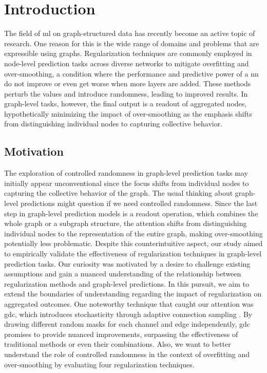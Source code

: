 \chapter{Introduction}%
\label{sec:intro}

\setcounter{page}{1}			%

The field of \acs{ml} on graph-structured data has recently become an active topic of research.
One reason for this is the wide range of domains and problems that are expressible using graphs.
Regularization techniques are commonly employed in node-level prediction tasks across diverse networks to mitigate overfitting and over-smoothing, a condition where the performance and predictive power of a \ac{nn} do not improve or even get worse when more layers are added. %
These methods perturb the values and introduce randomness, leading to improved results.
In graph-level tasks, however, the final output is a readout of aggregated nodes, hypothetically minimizing the impact of over-smoothing as the emphasis shifts from distinguishing individual nodes to capturing collective behavior.


\section{Motivation}%
\label{sec:intro:motivation}

The exploration of controlled randomness in graph-level prediction tasks may initially appear unconventional since the focus shifts from individual nodes to capturing the collective behavior of the graph.
The usual thinking about graph-level predictions might question if we need controlled randomness.
Since the last step in graph-level prediction models is a readout operation, which combines the whole graph or a subgraph structure,
the attention shifts from distinguishing individual nodes to the representation of the entire graph, making over-smoothing potentially less problematic.
Despite this counterintuitive aspect, our study aimed to empirically validate the effectiveness of regularization techniques in graph-level prediction tasks.
Our curiosity was motivated by a desire to challenge existing assumptions and gain a nuanced understanding of the relationship between regularization methods and graph-level predictions.
In this pursuit, we aim to extend the boundaries of understanding regarding the impact of regularization on aggregated outcomes.
One noteworthy technique that caught our attention was \acf{gdc}, which introduces stochasticity through adaptive connection sampling \cite{Hasanzadeh2020}.
By drawing different random masks for each channel and edge independently, \ac{gdc} promises to provide nuanced improvements, surpassing the effectiveness of traditional methods or even their combinations.
Also, we want to better understand the role of controlled randomness in the context of overfitting and over-smoothing by evaluating four regularization techniques.

